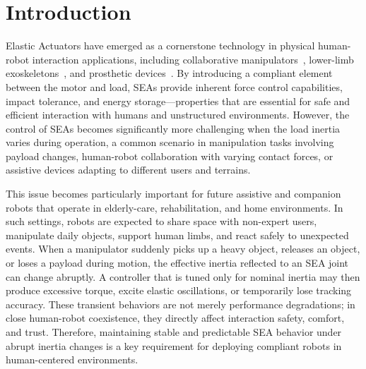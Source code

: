 \documentclass[lettersize,journal]{IEEEtran}
\begin{document}
\section{Introduction}

 Elastic Actuators have emerged as a cornerstone technology in physical human-robot interaction applications, including collaborative manipulators~\cite{li2024Advances}, lower-limb exoskeletons~\cite{hang2025Design}, and prosthetic devices~\cite{fagioli2024Underactuated}. By introducing a compliant element between the motor and load, SEAs provide inherent force control capabilities, impact tolerance, and energy storage—properties that are essential for safe and efficient interaction with humans and unstructured environments. However, the control of SEAs becomes significantly more challenging when the load inertia varies during operation, a common scenario in manipulation tasks involving payload changes, human-robot collaboration with varying contact forces, or assistive devices adapting to different users and terrains.

This issue becomes particularly important for future assistive and companion robots that operate in elderly-care, rehabilitation, and home environments. In such settings, robots are expected to share space with non-expert users, manipulate daily objects, support human limbs, and react safely to unexpected events. When a manipulator suddenly picks up a heavy object, releases an object, or loses a payload during motion, the effective inertia reflected to an SEA joint can change abruptly. A controller that is tuned only for nominal inertia may then produce excessive torque, excite elastic oscillations, or temporarily lose tracking accuracy. These transient behaviors are not merely performance degradations; in close human-robot coexistence, they directly affect interaction safety, comfort, and trust. Therefore, maintaining stable and predictable SEA behavior under abrupt inertia changes is a key requirement for deploying compliant robots in human-centered environments.
\end{document}

